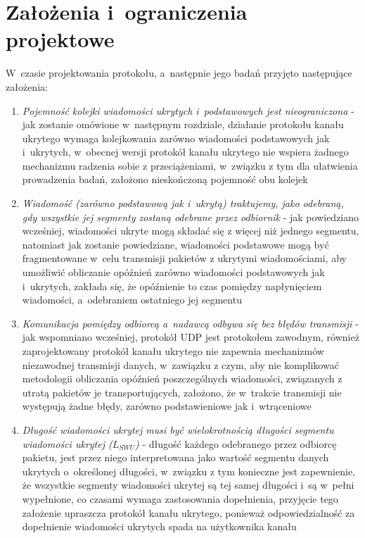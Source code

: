 \documentclass[a4paper, twoside, 12pt]{report}
\begin{document}
    \section{Założenia i~ograniczenia projektowe}
    W~czasie projektowania protokołu, a~następnie jego badań przyjęto następujące założenia:
    \begin{enumerate}
        \item \emph{Pojemność kolejki wiadomości ukrytych i~podstawowych jest nieograniczona} -
            jak zostanie omówione w~następnym rozdziale, działanie protokołu
            kanału ukrytego wymaga kolejkowania zarówno wiadomości podstawowych
            jak i~ukrytych, w~obecnej wersji protokół kanału ukrytego nie wspiera
            żadnego mechanizmu radzenia sobie z przeciążeniami, w~związku z tym
            dla ułatwienia prowadzenia badań, założono nieskończoną pojemność obu kolejek

        \item \emph{Wiadomość (zarówno podstawową jak i~ukrytą) traktujemy, jako odebraną,
            gdy wszystkie jej segmenty zostaną odebrane przez odbiornik} - jak powiedziano
            wcześniej, wiadomości ukryte mogą składać się z więcej niż jednego segmentu,
            natomiast jak zostanie powiedziane, wiadomości podstawowe mogą być fragmentowane
            w~celu transmisji pakietów z ukrytymi wiadomościami, aby umożliwić
            obliczanie opóźnień zarówno wiadomości podstawowych jak i~ukrytych,
            zakłada się, że opóźnienie to czas pomiędzy napłynięciem wiadomości,
            a~odebraniem ostatniego jej segmentu

        \item \emph{Komunikacja pomiędzy odbiorcą a~nadawcą odbywa się bez błędów transmisji} -
            jak wspomniano wcześniej, protokół UDP jest protokołem zawodnym, również
            zaprojektowany protokół kanału ukrytego nie zapewnia mechanizmów niezawodnej
            transmisji danych, w~zawiązku z czym, aby nie komplikować metodologii
            obliczania opóźnień poszczególnych wiadomości, związanych z utratą
            pakietów je transportujących, założono, że w~trakcie transmisji nie
            występują żadne błędy, zarówno podstawieniowe jak i~wtrąceniowe

        \item \emph{Długość wiadomości ukrytej musi być wielokrotnością długości segmentu
            wiadomości ukrytej (\(L_{SWU}\))} - długość każdego odebranego przez odbiorcę pakietu,
            jest przez niego interpretowana jako wartość segmentu danych ukrytych o~określonej
            długości, w~związku z tym konieczne jest zapewnienie, że wszystkie segmenty
            wiadomości ukrytej są tej samej długości i~są w~pełni wypełnione, co czasami
            wymaga zastosowania dopełnienia, przyjęcie tego założenie upraszcza protokół
            kanału ukrytego, ponieważ odpowiedzialność za dopełnienie wiadomości ukrytych
            spada na użytkownika kanału
    \end{enumerate}
\end{document}
